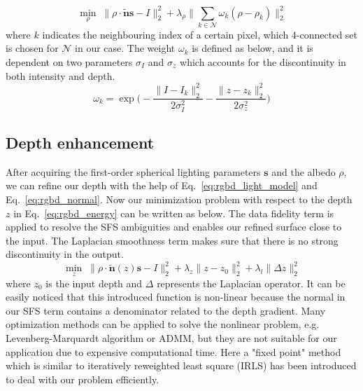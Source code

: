 \begin{equation}\label{eq:rgbd_albedo_estimate}
    \min_{\rho} \; \lVert \rho \cdot \tilde{\mathbf{n}} \mathbf{s} - I\rVert^2_2 + \lambda_{\rho} \lVert \sum_{k \in \mathcal{N}} \omega_k (\rho - \rho_k) \rVert^2_2
\end{equation}
where $k$ indicates the neighbouring index of a certain pixel, which 4-connected set is chosen for $\mathcal{N}$ in our case. 
The weight $\omega_k$ is defined as below, and it is dependent on two parameters $\sigma_I$ and $\sigma_z$ which accounts for the discontinuity in both intensity and depth.
\begin{equation}
    \omega_k=\exp\Bigg(-\dfrac{\lVert I - I_k \rVert^2_2}{2\sigma_I^2} -\dfrac{\lVert z - z_k \rVert^2_2}{2\sigma_z^2}\Bigg)
\end{equation}

\subsection{Depth enhancement}
After acquiring the first-order spherical lighting parameters $\mathbf{s}$ and the albedo $\rho$, we can refine our depth with the help of Eq.~\ref{eq:rgbd_light_model} and Eq.~\ref{eq:rgbd_normal}.
Now our minimization problem with respect to the depth $z$ in Eq.~\ref{eq:rgbd_energy} can be written as below. 
The data fidelity term is applied to resolve the SFS ambiguities and enables our refined surface close to the input. The Laplacian smoothness term makes sure that there is no strong discontinuity in the output. 
\begin{equation}\label{eq:rgbd_depth_refine}
    \min_{z} \; \lVert \rho \cdot \tilde{\mathbf{n}}(z) \mathbf{s} - I \rVert^2_2 + \lambda_z \lVert z - z_0\rVert^2_2 + \lambda_l \lVert \Delta z \rVert^2_2
\end{equation}
where $z_0$ is the input depth and $\Delta$ represents the  Laplacian operator. 
It can be easily noticed that this introduced function is non-linear because the normal in our SFS term contains a denominator related to the depth gradient. 
Many optimization methods can be applied to solve the nonlinear problem, e.g. Levenberg-Marquardt algorithm or ADMM, but they are not suitable for our application due to expensive computational time. 
Here a "fixed point" method which is similar to iteratively reweighted least square (IRLS) has been introduced to deal with our problem efficiently. 

